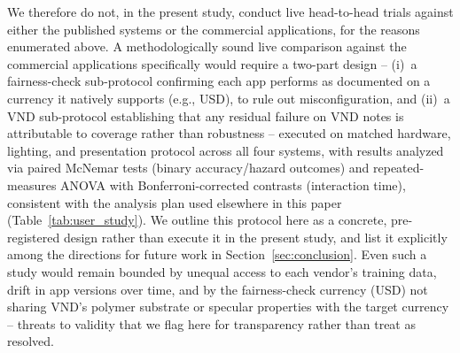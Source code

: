 \documentclass[final,5p,times,twocolumn,authoryear]{elsarticle}
\begin{document}
We therefore do not, in the present study, conduct live head-to-head trials against either the published systems or the commercial applications, for the reasons enumerated above. A methodologically sound live comparison against the commercial applications specifically would require a two-part design -- (i)~a fairness-check sub-protocol confirming each app performs as documented on a currency it natively supports (e.g., USD), to rule out misconfiguration, and (ii)~a VND sub-protocol establishing that any residual failure on VND notes is attributable to coverage rather than robustness -- executed on matched hardware, lighting, and presentation protocol across all four systems, with results analyzed via paired McNemar tests (binary accuracy/hazard outcomes) and repeated-measures ANOVA with Bonferroni-corrected contrasts (interaction time), consistent with the analysis plan used elsewhere in this paper (Table~\ref{tab:user_study}). We outline this protocol here as a concrete, pre-registered design rather than execute it in the present study, and list it explicitly among the directions for future work in Section~\ref{sec:conclusion}. Even such a study would remain bounded by unequal access to each vendor's training data, drift in app versions over time, and by the fairness-check currency (USD) not sharing VND's polymer substrate or specular properties with the target currency -- threats to validity that we flag here for transparency rather than treat as resolved.
\end{document}
